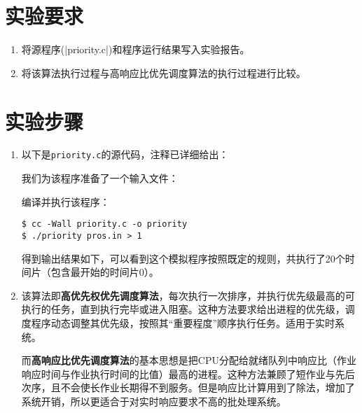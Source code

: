 \documentclass[c5size,a4paper,nofonts]{ctexart}
\begin{document}
\section{实验要求}
\begin{enumerate}[label={(\arabic*)}]
\item 将源程序(|priority.c|)和程序运行结果写入实验报告。
\item 将该算法执行过程与高响应比优先调度算法的执行过程进行比较。
\end{enumerate}

\fi

\section{实验步骤}

\begin{enumerate}

\item 以下是{\tt priority.c}的源代码，注释已详细给出：

{\small\linespread{1}}

我们为该程序准备了一个输入文件：


编译并执行该程序：

\begin{Verbatim}[frame=single]
$ cc -Wall priority.c -o priority
$ ./priority pros.in > 1
\end{Verbatim}

得到输出结果如下，可以看到这个模拟程序按照既定的规则，共执行了20个时间片（包含最开始的时间片0）。


\item 该算法即{\bf 高优先权优先调度算法}，每次执行一次排序，并执行优先级最高的可执行的任务，直到执行完毕或进入阻塞。这种方法要求给出进程的优先级，调度程序动态调整其优先级，按照其“重要程度”顺序执行任务。适用于实时系统。

而{\bf 高响应比优先调度算法}的基本思想是把CPU分配给就绪队列中响应比（作业响应时间与作业执行时间的比值）最高的进程。这种方法兼顾了短作业与先后次序，且不会使长作业长期得不到服务。但是响应比计算用到了除法，增加了系统开销，所以更适合于对实时响应要求不高的批处理系统。

\end{enumerate}
\end{document}
